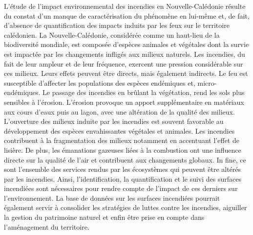 \documentclass[
  11pt,
  letterpaper,
]{scrreprt}
\begin{document}
L'étude de l'impact environnemental des incendies en Nouvelle-Calédonie
résulte du constat d'un manque de caractérisation du phénomène en
lui-même et, de fait, d'absence de quantification des impacts induits
par les feux sur le territoire calédonien. La Nouvelle-Calédonie,
considérée comme un haut-lieu de la biodiversité mondiale, est composée
d'espèces animales et végétales dont la survie est impactée par les
changements infligés aux milieux naturels. Les incendies, du fait de
leur ampleur et de leur fréquence, exercent une pression considérable
sur ces milieux. Leurs effets peuvent être directs, mais également
indirects. Le feu est susceptible d'affecter les populations des espèces
endémiques et, micro-endémiques. Le passage des incendies en brûlant la
végétation, rend les sols plus sensibles à l'érosion. L'érosion provoque
un apport supplémentaire en matériaux aux cours d'eaux puis au lagon,
avec une altération de la qualité des milieux. L'ouverture des milieux
induite par les incendies est souvent favorable au développement des
espèces envahissantes végétales et animales. Les incendies contribuent à
la fragmentation des milieux notamment en accentuant l'effet de lisière.
De plus, les émanations gazeuses liées à la combustion ont une influence
directe sur la qualité de l'air et contribuent aux changements globaux.
In fine, ce sont l'ensemble des services rendus par les écosystèmes qui
peuvent être altérés par les incendies. Ainsi, l'identification, la
quantification et le suivi des surfaces incendiées sont nécessaires pour
rendre compte de l'impact de ces derniers sur l'environnement. La base
de données sur les surfaces incendiées pourrait également servir à
consolider les stratégies de luttes contre les incendies, aiguiller la
gestion du patrimoine naturel et enfin être prise en compte dans
l'aménagement du territoire.
\end{document}
